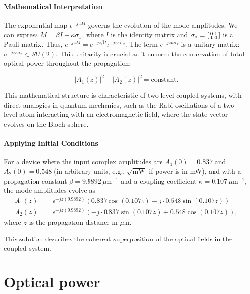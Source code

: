 \documentclass[10pt, a4paper]{article}
\begin{document}
\paragraph{Mathematical Interpretation} The exponential map $e^{-jzM}$ governs the evolution of the mode amplitudes.
We can express $M = \beta I + \kappa \sigma_x$,
where $I$ is the identity matrix and $\sigma_x = \begin{bsmallmatrix} 0 & 1 \\ 1 & 0 \end{bsmallmatrix}$ is a Pauli matrix.
Thus, $e^{-jzM} = e^{-jz\beta I} e^{-jz\kappa \sigma_x}$. The term $e^{-jz\kappa \sigma_x}$ is a unitary matrix: $e^{-jz\kappa \sigma_x} \in SU(2)$.
This unitarity is crucial as it ensures the conservation of total optical power throughout the propagation:

\[|A_1(z)|^2 + |A_2(z)|^2 = \text{constant}.\]

This mathematical structure is characteristic of two-level coupled systems, with direct analogies in quantum mechanics, such as the Rabi oscillations of a two-level atom interacting with an electromagnetic field, where the state vector evolves on the Bloch sphere.

\paragraph{Applying Initial Conditions}
For a device where the input complex amplitudes are $A_1(0) = 0.837$ and $A_2(0) = 0.548$ (in arbitrary units, e.g., $\sqrt{\text{mW}}$ if power is in mW), and with a propagation constant $\beta = 9.9892 \, \mu\text{m}^{-1}$ and a coupling coefficient $\kappa = 0.107 \, \mu\text{m}^{-1}$, the mode amplitudes evolve as
\begin{align}
A_1(z) &= e^{-jz(9.9892)} (0.837\cos(0.107z) - j \cdot 0.548\sin(0.107z)) \\
A_2(z) &= e^{-jz(9.9892)} (-j \cdot 0.837\sin(0.107z) + 0.548\cos(0.107z)),
\end{align}
where $z$ is the propagation distance in $\mu\text{m}$.

This solution describes the coherent superposition of the optical fields in the coupled system.

\section{Optical power}
\end{document}
